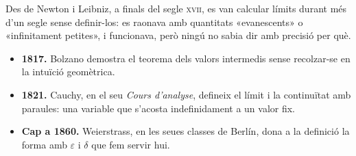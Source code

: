 
\begin{frame}

Des de Newton i Leibniz, a finals del segle \textsc{xvii}, es van calcular
límits durant més d'un segle sense definir-los: es raonava amb quantitats
«evanescents» o «infinitament petites», i funcionava, però ningú no sabia dir
amb precisió per què.

\begin{itemize}
  \item \textbf{1817.} Bolzano demostra el teorema dels valors intermedis
        sense recolzar-se en la intuïció geomètrica.
  \item \textbf{1821.} Cauchy, en el seu \emph{Cours d'analyse}, defineix el
        límit i la continuïtat amb paraules: una variable que s'acosta
        indefinidament a un valor fix.
  \item \textbf{Cap a 1860.} Weierstrass, en les seues classes de Berlín, dona
        a la definició la forma amb $\varepsilon$ i $\delta$ que fem servir
        hui.
\end{itemize}

\end{frame}
